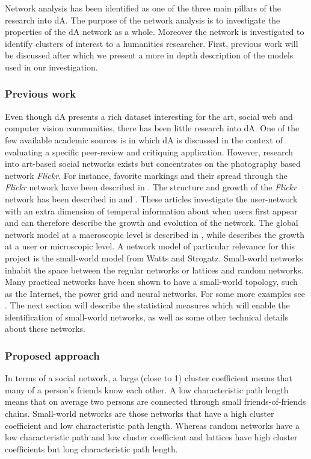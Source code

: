 Network analysis has been identified as one of the three main pillars of the research into dA. The purpose of the network analysis is to investigate the properties of the dA network as a whole. Moreover the network is investigated to identify clusters of interest to a humanities researcher. First, previous work will be discussed after which we present a more in depth description of the models used in our investigation.

\subsubsection{Previous work}
Even though dA presents a rich dataset interesting for the art, social web and computer vision communities, there has been little research into dA. One of the few available academic sources is \cite{DaMasters} in which dA is discussed in the context of evaluating a specific peer-review and critiquing application.
However, research into art-based social networks exists but concentrates on the photography based network \textit{Flickr}. For instance, favorite markings and their spread through the \textit{Flickr} network have been described in \cite{cha2009measurement}. The structure and growth of the \textit{Flickr} network has been described in \cite{kumar2006structure} and \cite{leskovec2008microscopic}. These articles investigate the user-network with an extra dimension of temperal information about when users first appear and can therefore describe the growth and evolution of the network. The global network model at a macroscopic level is described in \cite{kumar2006structure}, while \cite{leskovec2008microscopic} describes the growth at a user or microscopic level. 
A network model of particular relevance for this project is the small-world model \cite{watts1998collective} from Watts and Strogatz. Small-world networks inhabit the space between the regular networks or lattices and random networks. Many practical networks have been shown to have a small-world topology, such as the Internet, the power grid and neural networks. For some more examples see \cite{albert2002statistical}. The next section will describe the statistical measures which will enable the identification of small-world networks, as well as some other technical details about these networks.


\subsubsection{Proposed approach}\label{net_proposed_approach}
In terms of a social network, a large (close to 1) cluster coefficient means that many of a person's friends know each other. A low characteristic path length means that on average two persons are connected through small friends-of-friends chains.
Small-world networks are those networks that have a high cluster coefficient and low characteristic path length.  Whereas random networks have a low characteristic path and low cluster coefficient and lattices have high cluster coefficients but long characteristic path length. 

